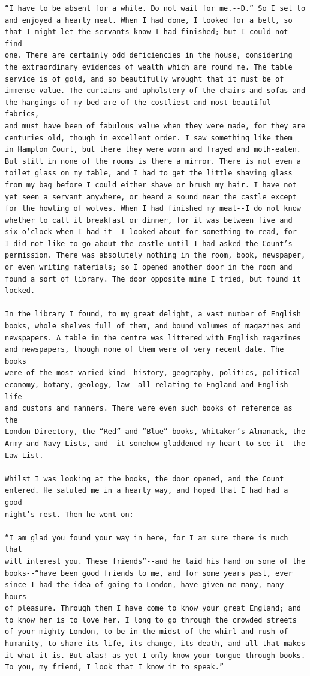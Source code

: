 \documentclass{article}
\begin{document}
\begin{verbatim}
“I have to be absent for a while. Do not wait for me.--D.” So I set to
and enjoyed a hearty meal. When I had done, I looked for a bell, so
that I might let the servants know I had finished; but I could not find
one. There are certainly odd deficiencies in the house, considering
the extraordinary evidences of wealth which are round me. The table
service is of gold, and so beautifully wrought that it must be of
immense value. The curtains and upholstery of the chairs and sofas and
the hangings of my bed are of the costliest and most beautiful fabrics,
and must have been of fabulous value when they were made, for they are
centuries old, though in excellent order. I saw something like them
in Hampton Court, but there they were worn and frayed and moth-eaten.
But still in none of the rooms is there a mirror. There is not even a
toilet glass on my table, and I had to get the little shaving glass
from my bag before I could either shave or brush my hair. I have not
yet seen a servant anywhere, or heard a sound near the castle except
for the howling of wolves. When I had finished my meal--I do not know
whether to call it breakfast or dinner, for it was between five and
six o’clock when I had it--I looked about for something to read, for
I did not like to go about the castle until I had asked the Count’s
permission. There was absolutely nothing in the room, book, newspaper,
or even writing materials; so I opened another door in the room and
found a sort of library. The door opposite mine I tried, but found it
locked.

In the library I found, to my great delight, a vast number of English
books, whole shelves full of them, and bound volumes of magazines and
newspapers. A table in the centre was littered with English magazines
and newspapers, though none of them were of very recent date. The books
were of the most varied kind--history, geography, politics, political
economy, botany, geology, law--all relating to England and English life
and customs and manners. There were even such books of reference as the
London Directory, the “Red” and “Blue” books, Whitaker’s Almanack, the
Army and Navy Lists, and--it somehow gladdened my heart to see it--the
Law List.

Whilst I was looking at the books, the door opened, and the Count
entered. He saluted me in a hearty way, and hoped that I had had a good
night’s rest. Then he went on:--

“I am glad you found your way in here, for I am sure there is much that
will interest you. These friends”--and he laid his hand on some of the
books--“have been good friends to me, and for some years past, ever
since I had the idea of going to London, have given me many, many hours
of pleasure. Through them I have come to know your great England; and
to know her is to love her. I long to go through the crowded streets
of your mighty London, to be in the midst of the whirl and rush of
humanity, to share its life, its change, its death, and all that makes
it what it is. But alas! as yet I only know your tongue through books.
To you, my friend, I look that I know it to speak.”


\end{verbatim}
\end{document}
